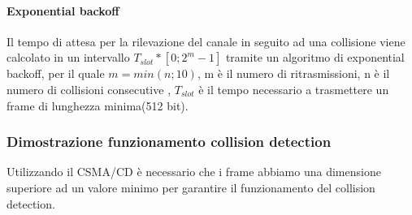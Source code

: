 \paragraph{Exponential backoff}
Il tempo di attesa per la rilevazione del canale in seguito ad una collisione viene calcolato in un intervallo $T_{slot}*[0;2^m-1]$ tramite un algoritmo di exponential backoff, per il quale $m = min(n;10)$, m è il numero di ritrasmissioni, n è il numero di collisioni consecutive , $T_{slot}$ è il tempo necessario a trasmettere un frame di lunghezza minima(512 bit). 




\newpage

\subsubsection{Dimostrazione funzionamento collision detection}
Utilizzando il CSMA/CD è necessario che i frame abbiamo una dimensione
superiore ad un valore minimo per garantire il funzionamento del collision
detection.
